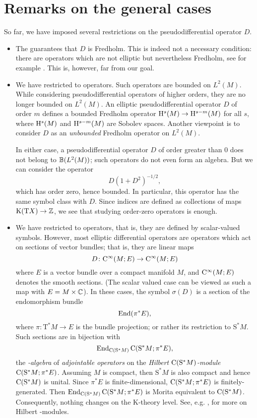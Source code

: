 \documentclass[reqno]{scrartcl}
\theoremstyle{definition}
\theoremstyle{remark}
\begin{document}
\section{Remarks on the general cases}\label{Sec: remarks on the general case}
So far, we have imposed several restrictions on the pseudodifferential operator $D$.
\begin{itemize}
\item The  guarantees that $D$ is Fredholm. This is indeed not a necessary condition: there are operators which are not elliptic but nevertheless Fredholm, see for example \cite{baum2014k}. This is, however, far from our goal.
\item We have restricted to  operators. Such operators are bounded on $L^2(M)$. While considering pseudodifferential operators of higher orders, they are no longer bounded on $L^2(M)$. An elliptic pseudodifferential operator $D$ of order $m$ defines a bounded Fredholm operator $\mathrm{H}^{s}(M)\to\mathrm{H}^{s-m}(M)$ for all $s$, where $\mathrm{H}^{s}(M)$ and $\mathrm{H}^{s-m}(M)$ are Sobolev spaces. Another viewpoint is to consider $D$ as an \emph{unbounded} Fredholm operator on $L^2(M)$.

In either case, a pseudodifferential operator $D$ of order greater than $0$ does not belong to $\mathbb{B}(L^2(M))$; such operators do not even form an algebra. But we can consider the operator
\[ D(1+D^2)^{-1/2}, \]
which has order zero, hence bounded. In particular, this operator has the same symbol class with $D$. Since indices are defined as collections of maps $\operatorname{K}(\mathrm{T}X)\to\mathbb{Z}$, we see that studying order-zero operators is enough.

\item We have restricted to  operators, that is, they are defined by scalar-valued symbols. However, most elliptic differential operators are operators which act on sections of vector bundles; that is, they are linear maps
\[ D\colon\mathrm{C}^\infty(M;E)\to\mathrm{C}^\infty(M;E) \]
where $E$ is a vector bundle over a compact manifold $M$, and $\mathrm{C}^\infty(M;E)$ denotes the smooth sections. (The scalar valued case can be viewed as such a map with $E=M\times\mathbb{C}$). In these cases, the symbol $\sigma(D)$ is a section of the endomorphism bundle
\[ \operatorname{End}(\pi^*E), \]
where $\pi\colon \mathrm{T}^*M\to E$ is the bundle projection; or rather its restriction to $\mathrm{S}^*M$. Such sections are in bijection with 
\[ \operatorname{End}_{\mathrm{C}(\mathrm{S}^*M)}\mathrm{C}(\mathrm{S}^*M;\pi^*E), \] 
the \emph{\Cst-algebra} of \emph{adjointable operators} on the \emph{Hilbert $\mathrm{C}(\mathrm{S}^*M)$-module} $\mathrm{C}(\mathrm{S}^*M;\pi^*E)$. Assuming $M$ is compact, then $\mathrm{S}^*M$ is also compact and hence $\mathrm{C}(\mathrm{S}^*M)$ is unital. Since $\pi^*E$ is finite-dimensional, $\mathrm{C}(\mathrm{S}^*M;\pi^*E)$ is finitely-generated. Then $\operatorname{End}_{\mathrm{C}(\mathrm{S}^*M)}\mathrm{C}(\mathrm{S}^*M;\pi^*E)$ is Morita equivalent to $\mathrm{C}(\mathrm{S}^*M)$. Consequently, nothing changes on the K-theory level. See, e.g. \cite{manuilov2005hilbert}, for more on Hilbert \Cst-modules.

\end{itemize} 
\end{document}
